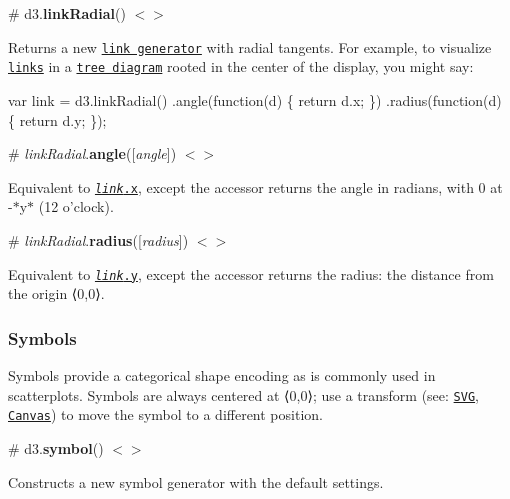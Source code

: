 \label{_linkRadial}%
\# d3.{\bfseries link\+Radial}() \href{https://github.com/d3/d3-shape/blob/master/src/link/index.js#L78}{\tt $<$$>$}

Returns a new \href{#_link}{\tt link generator} with radial tangents. For example, to visualize \href{https://github.com/d3/d3-hierarchy/blob/master/README.md#node_links}{\tt links} in a \href{https://github.com/d3/d3-hierarchy/blob/master/README.md#tree}{\tt tree diagram} rooted in the center of the display, you might say\+:


\begin{DoxyCode}
var link = d3.linkRadial()
    .angle(function(d) \{ return d.x; \})
    .radius(function(d) \{ return d.y; \});
\end{DoxyCode}


\label{_linkRadial_angle}%
\# {\itshape link\+Radial}.{\bfseries angle}(\mbox{[}{\itshape angle}\mbox{]}) \href{https://github.com/d3/d3-shape/blob/master/src/link/index.js#L80}{\tt $<$$>$}

Equivalent to \href{#link_x}{\tt {\itshape link}.x}, except the accessor returns the angle in radians, with 0 at -\/$\ast$y$\ast$ (12 o’clock).

\label{_linkRadial_radius}%
\# {\itshape link\+Radial}.{\bfseries radius}(\mbox{[}{\itshape radius}\mbox{]}) \href{https://github.com/d3/d3-shape/blob/master/src/link/index.js#L81}{\tt $<$$>$}

Equivalent to \href{#link_y}{\tt {\itshape link}.y}, except the accessor returns the radius\+: the distance from the origin ⟨0,0⟩.

\subsubsection*{Symbols}

\href{#symbolCircle}{\tt }\href{#symbolCross}{\tt }\href{#symbolDiamond}{\tt }\href{#symbolSquare}{\tt }\href{#symbolStar}{\tt }\href{#symbolTriangle}{\tt }

Symbols provide a categorical shape encoding as is commonly used in scatterplots. Symbols are always centered at ⟨0,0⟩; use a transform (see\+: \href{http://www.w3.org/TR/SVG/coords.html#TransformAttribute}{\tt S\+VG}, \href{http://www.w3.org/TR/2dcontext/#transformations}{\tt Canvas}) to move the symbol to a different position.

\label{_symbol}%
\# d3.{\bfseries symbol}() \href{https://github.com/d3/d3-shape/blob/master/src/symbol.js}{\tt $<$$>$}

Constructs a new symbol generator with the default settings.

